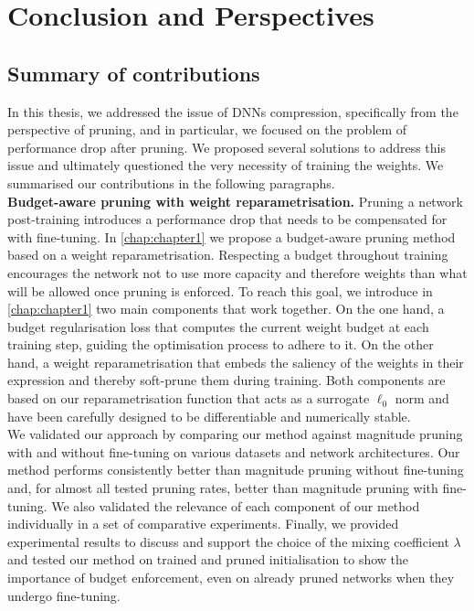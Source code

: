 \chapter{Conclusion and Perspectives}

\section{Summary of contributions}

In this thesis, we addressed the issue of \aclp{DNN} compression, specifically
from the perspective of pruning, and in particular, we focused on the problem of
performance drop after pruning. We proposed several solutions to address this
issue and ultimately questioned the very necessity of training the weights. We
summarised our contributions in the following paragraphs.\\

\noindent \textbf{Budget-aware pruning with weight reparametrisation.} Pruning a
network post-training introduces a performance drop that needs to be compensated
for with fine-tuning. In \cref{chap:chapter1} we propose a budget-aware pruning
method based on a weight reparametrisation. Respecting a budget throughout
training encourages the network not to use more capacity and therefore weights
than what will be allowed once pruning is enforced.  To reach this goal, we
introduce in \cref{chap:chapter1} two main components that work together. On the
one hand, a budget regularisation loss that computes the current weight budget
at each training step, guiding the optimisation process to adhere to it. On the
other hand, a weight reparametrisation that embeds the saliency of the weights
in their expression and thereby soft-prune them during training. Both components
are based on our reparametrisation function that acts as a surrogate $\ell_0$
norm and have been carefully designed to be differentiable and numerically
stable.\\

We validated our approach by comparing our method against magnitude pruning with
and without fine-tuning on various datasets and network architectures. Our
method performs consistently better than magnitude pruning without fine-tuning
and, for almost all tested pruning rates, better than magnitude pruning with
fine-tuning. We also validated the relevance of each component of our method
individually in a set of comparative experiments. Finally, we provided
experimental results to discuss and support the choice of the mixing coefficient
$\lambda$ and tested our method on trained and pruned initialisation to show the
importance of budget enforcement, even on already pruned networks when they
undergo fine-tuning.\\

